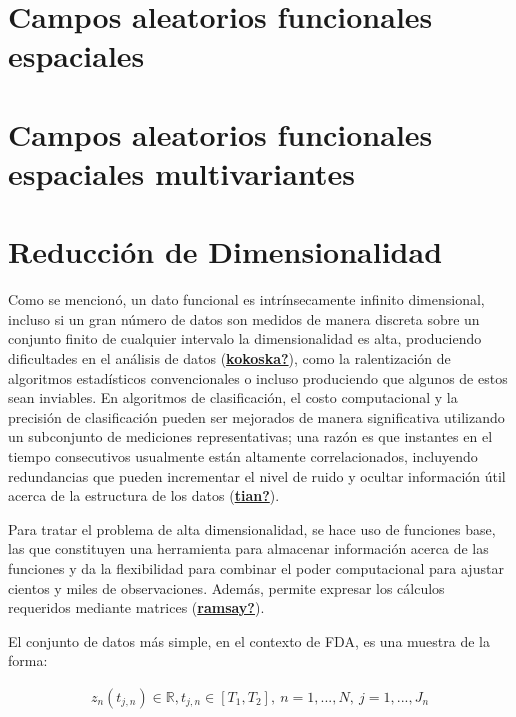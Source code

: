 \documentclass[
]{book}
\begin{document}
\hypertarget{campos-aleatorios-funcionales-espaciales}{%
\section{Campos aleatorios funcionales espaciales}\label{campos-aleatorios-funcionales-espaciales}}

\hypertarget{campos-aleatorios-funcionales-espaciales-multivariantes}{%
\section{Campos aleatorios funcionales espaciales multivariantes}\label{campos-aleatorios-funcionales-espaciales-multivariantes}}

\hypertarget{reducciuxf3n-de-dimensionalidad}{%
\section{Reducción de Dimensionalidad}\label{reducciuxf3n-de-dimensionalidad}}

Como se mencionó, un dato funcional es intrínsecamente infinito dimensional, incluso si un gran número de datos son medidos de manera discreta sobre un conjunto finito de cualquier intervalo la dimensionalidad es alta, produciendo dificultades en el análisis de datos (\protect\hyperlink{ref-kokoska}{\textbf{kokoska?}}), como la ralentización de algoritmos estadísticos convencionales o incluso produciendo que algunos de estos sean inviables. En algoritmos de clasificación, el costo computacional y la precisión de clasificación pueden ser mejorados de manera significativa utilizando un subconjunto de mediciones representativas; una razón es que instantes en el tiempo consecutivos usualmente están altamente correlacionados, incluyendo redundancias que pueden incrementar el nivel de ruido y ocultar información útil acerca de la estructura de los datos (\protect\hyperlink{ref-tian}{\textbf{tian?}}).

Para tratar el problema de alta dimensionalidad, se hace uso de funciones base, las que constituyen una herramienta para almacenar información acerca de las funciones y da la flexibilidad para combinar el poder computacional para ajustar cientos y miles de observaciones. Además, permite expresar los cálculos requeridos mediante matrices (\protect\hyperlink{ref-ramsay}{\textbf{ramsay?}}).

El conjunto de datos más simple, en el contexto de FDA, es una muestra de la forma:

\begin{align}
    z_n(t_{j,n})\in\mathbb{R}, t_{j,n}\in [T_1,T_2],\ n=1,...,N,\ j=1,...,J_n
\end{align}
\end{document}
